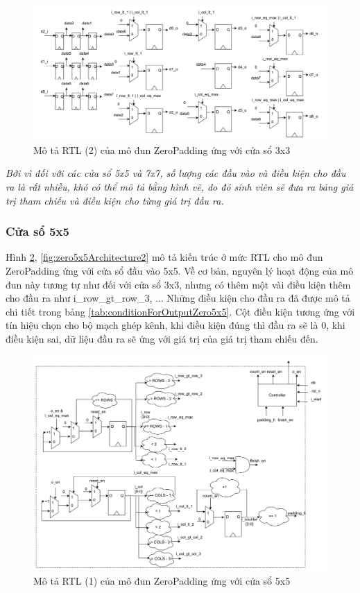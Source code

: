 \begin{figure}[!ht]
    \centering
    \includegraphics[width=\linewidth]{figures/zero3x3Architecture2.png}
    \caption{Mô tả RTL (2) của mô đun ZeroPadding ứng với cửa sổ 3x3}
    \label{fig:zero3x3Architecture2}
\end{figure}


\textit{
Bởi vì đối với các cửa sổ 5x5 và 7x7, số lượng các đầu vào và điều kiện cho đầu ra là rất nhiều, khó có thể mô tả bằng hình vẽ, do đó sinh viên sẽ đưa ra bảng giá trị tham chiếu và điều kiện cho từng giá trị đầu ra. }
\clearpage
\subsubsection{Cửa sổ 5x5}
Hình \ref{fig:zero5x5Architecture1}, \ref{fig:zero5x5Architecture2} mô tả kiến trúc ở mức RTL cho mô đun ZeroPadding ứng với cửa sổ đầu vào 5x5. Về cơ bản, nguyên lý hoạt động của mô đun này tương tự như đối với cửa sổ 3x3, nhưng có thêm một vài điều kiện thêm cho đầu ra như i\_row\_gt\_row\_3, ... Những điều kiện cho đầu ra đã được mô tả chi tiết trong bảng \ref{tab:conditionForOutputZero5x5}. Cột điều kiện tương ứng với tín hiệu chọn cho bộ mạch ghép kênh, khi điều kiện đúng thì đầu ra sẽ là 0, khi điều kiện sai, dữ liệu đầu ra sẽ ứng với giá trị của giá trị tham chiếu đến.


\begin{figure}[!ht]
    \centering
    \includegraphics[width=\linewidth]{figures/zero5x5Architecture1.png}
    \caption{Mô tả RTL (1) của mô đun ZeroPadding ứng với cửa sổ 5x5}
    \label{fig:zero5x5Architecture1}
\end{figure}

